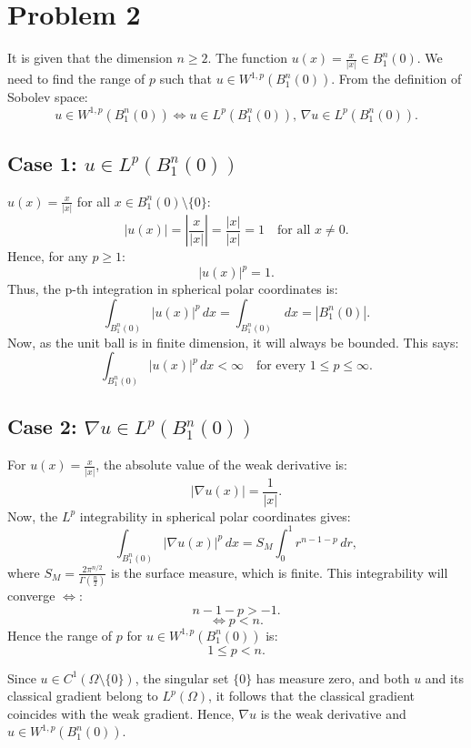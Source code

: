 \section{Problem 2}

It is given that the dimension $n\geq 2$. The function $u(x)=\frac{x}{|x|}\in B_1^n(0)$. We need to find the range of $p$ such that $u\in W^{1,p}(B_1^n(0))$. From the definition of Sobolev space:
\[
u\in W^{1,p}(B_1^n(0)) \iff u\in L^p(B_1^n(0)), \, \nabla u\in L^p(B_1^n(0)).
\]

\subsection{Case 1: $u\in L^p(B_1^n(0))$}
$u(x)=\frac{x}{|x|}$ for all $x\in B_1^n(0)\setminus\{0\}$:
\[
|u(x)|=\left|\frac{x}{|x|}\right|=\frac{|x|}{|x|}=1 \quad \text{for all } x\neq 0.
\]
Hence, for any $p\geq 1$:
\[
|u(x)|^p= 1.
\]
Thus, the p-th integration in spherical polar coordinates is:
\[
\int_{B_1^n(0)}|u(x)|^p \, dx = \int_{B_1^n(0)} \, dx=|B_1^n(0)|.
\]
Now, as the unit ball is in finite dimension, it will always be bounded. This says:
\[
\int_{B_1^n(0)}|u(x)|^p \, dx < \infty \quad \text{for every } 1\leq p\leq\infty.
\]

\subsection{Case 2: $\nabla u\in L^p(B_1^n(0))$}
For $u(x)=\frac{x}{|x|}$, the absolute value of the weak derivative is:
\[
|\nabla u(x)| = \frac{1}{|x|}.
\]
Now, the $L^p$ integrability in spherical polar coordinates gives:
\[
\int_{B_1^n(0)}|\nabla u(x)|^p \, dx= S_M\int_0^1 r^{n-1-p} \, dr,
\]
where $S_M= \frac{2\pi^{n/2}}{\Gamma(\frac{n}{2})}$ is the surface measure, which is finite. This integrability will converge $\iff$:
\[
n-1-p>-1.
\]
\[
\iff p<n.
\]
Hence the range of $p$ for $u\in W^{1,p}(B_1^n(0))$ is:
\[
\boxed{
1\leq p < n.
}
\]

Since $u\in C^1(\Omega\setminus\{0\})$, the singular set $\{0\}$ has measure zero, and both $u$ and its classical gradient belong to $L^p(\Omega)$, it follows that the classical gradient coincides with the weak gradient. Hence, $\nabla u$ is the weak derivative and $u\in W^{1,p}(B_{1}^n(0))$.

